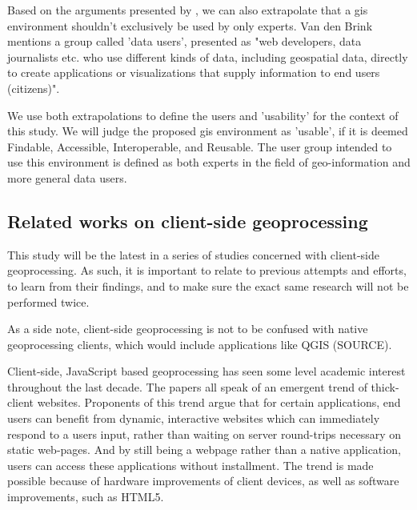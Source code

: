 Based on the arguments presented by \cite{brink_geospatial_2018}, we can also extrapolate that a \ac{gis} environment shouldn't exclusively be used by only experts. Van den Brink mentions a group called 'data users', presented as "web developers, data journalists etc. who use different kinds of data, including geospatial data, directly to create applications or visualizations that supply information to end users (citizens)". 

We use both extrapolations to define the users and 'usability' for the context of this study. We will judge the proposed \ac{gis} environment as 'usable', if it is deemed Findable, Accessible, Interoperable, and Reusable. The user group intended to use this environment is defined as both experts in the field of geo-information and more general data users.


\subsection{Related works on client-side geoprocessing}


This study will be the latest in a series of studies concerned with client-side geoprocessing. As such, it is important to relate to previous attempts and efforts, to learn from their findings, and to make sure the exact same research will not be performed twice. 

As a side note, client-side geoprocessing is not to be confused with native geoprocessing clients, which would include applications like QGIS (SOURCE). 

Client-side, JavaScript based geoprocessing has seen some level academic interest throughout the last decade. The papers \cite{hamilton_client-side_2014, panidi_hybrid_2015, kulawiak_analysis_2019} all speak of an emergent trend of thick-client websites. Proponents of this trend argue that for certain applications, end users can benefit from dynamic, interactive websites which can immediately respond to a users input, rather than waiting on server round-trips necessary on static web-pages. And by still being a webpage rather than a native application, users can access these applications without installment. The trend is made possible because of hardware improvements of client devices, as well as software improvements, such as HTML5. 

